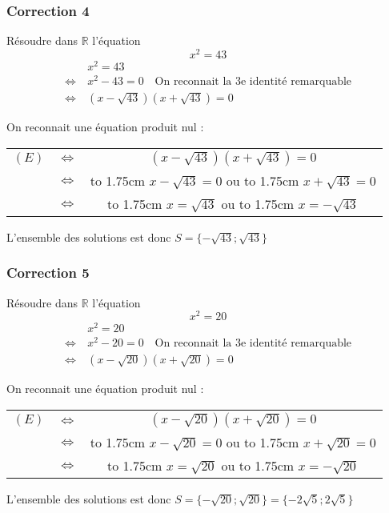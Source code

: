 \documentclass[15pt, mathserif]{beamer}
\newcommand{\R}{\mathbb{R}}			%
\begin{document}
\begin{frame}
\vspace{-10mm}
	\frametitle{Correction 4}
Résoudre dans $\R$ l'équation $$x^2=43$$ 
 \begin{align*} 
 & x^2=43 \\ 
 \Leftrightarrow ~& x^2- 43 =0 \text{~~ On reconnait la 3e identité remarquable} \\ 
 \Leftrightarrow ~ & (x-\sqrt{43})(x+\sqrt{43})=0 
 \end{align*}
 
  On reconnait une équation produit nul : 
 
 	\begin{tabular}{ccc} $(E)$ & $\Leftrightarrow$ & $(x-\sqrt{43})(x+ \sqrt{43})=0$  \\
		& $\Leftrightarrow$ &  \hbox to 1.75cm {\hfill $x-\sqrt{43}= 0$\hfill} \quad  ou \quad  \hbox to 1.75cm {\hfill $x+\sqrt{43}=0$\hfill} \\
		 & $\Leftrightarrow$ & \hbox to 1.75cm {\hfill $x = \sqrt{43} $\hfill} \quad  ou \quad \hbox to 1.75cm {\hfill $x = -\sqrt{43}$ \hfill} 
 \end{tabular} 
 
 L'ensemble des solutions est donc $S=\{-\sqrt{43};\sqrt{43}\}$\end{frame}


\begin{frame}
\vspace{-10mm}
	\frametitle{Correction 5}
Résoudre dans $\R$ l'équation $$x^2=20$$ 
 \begin{align*} 
 & x^2=20 \\ 
 \Leftrightarrow ~& x^2- 20 =0 \text{~~ On reconnait la 3e identité remarquable} \\ 
 \Leftrightarrow ~ & (x-\sqrt{20})(x+\sqrt{20})=0 
 \end{align*}
 
  On reconnait une équation produit nul : 
 
 	\begin{tabular}{ccc} $(E)$ & $\Leftrightarrow$ & $(x-\sqrt{20})(x+ \sqrt{20})=0$  \\
		& $\Leftrightarrow$ &  \hbox to 1.75cm {\hfill $x-\sqrt{20}= 0$\hfill} \quad  ou \quad  \hbox to 1.75cm {\hfill $x+\sqrt{20}=0$\hfill} \\
		 & $\Leftrightarrow$ & \hbox to 1.75cm {\hfill $x = \sqrt{20} $\hfill} \quad  ou \quad \hbox to 1.75cm {\hfill $x = -\sqrt{20}$ \hfill} 
 \end{tabular} 
 
 L'ensemble des solutions est donc $S=\{-\sqrt{20};\sqrt{20}\}=\{-2\sqrt{5};2\sqrt{5}\}$ 
 
 \end{frame}
\end{document}

